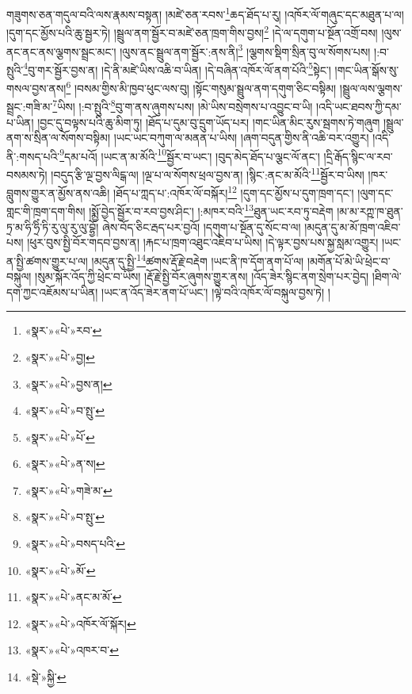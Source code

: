 གཟུགས་ཅན་གདུལ་བའི་ལས་རྣམས་བསྟན། །མཛེ་ཅན་རབས་\footnote{«སྣར་»«པེ་»རབ་}ཆད་ཐོད་པ་རུ། །འཁོར་ལོ་གཞུང་དང་མཐུན་པ་ལ། །དུག་དང་མྱོས་པའི་ཆུ་སྦྱར་ཏེ། །སྦྲུལ་ནག་སྦྱོར་བ་མཛེ་ཅན་ཁྲག་གིས་བྱས།\footnote{«སྣར་»«པེ་»བྱ།} །དེ་ལ་དགུག་པ་སྔོན་འགྲོ་བས། །ལུས་ནང་ནང་ནས་ལྕགས་སྦྲང་མང་། །ལུས་ནང་སྦྲུལ་ནག་སྦྱོར་:ནས་ནི།\footnote{«སྣར་»«པེ་»བྱས་ན།} །ལྕགས་སྡིག་སྲིན་བུ་ལ་སོགས་པས། །:བ་སྤུའི་\footnote{«སྣར་»«པེ་»བ་སྤུ་}བུ་གར་སྦྱོར་བྱས་ན། །དེ་ནི་མཛེ་ཡིས་འཆི་བ་ཡིན། །དེ་བཞིན་འཁོར་ལོ་ནག་པོའི་\footnote{«སྣར་»«པེ་»པོ་}སྟེང་། །གང་ཡིན་སྒོས་སུ་གསལ་བྱས་ནས།\footnote{«སྣར་»«པེ་»ན་ས།} །བསམ་གྱིས་མི་ཁྱབ་ཕུང་ལས་བུ། །སྟོང་གསུམ་སྦྲུལ་ནག་དགུག་ཅིང་བསྟིམ། །སྦྲུལ་ལས་ལྕགས་སྦྲང་:གཟི་མ་\footnote{«སྣར་»«པེ་»གཟེ་མ་}ཡིས། །:བ་སྤུའི་\footnote{«སྣར་»«པེ་»བ་སྤུ་}བུ་ག་ནས་ཞུགས་པས། །མེ་ཡིས་བསྲེགས་པ་འབྱུང་བ་ཡི། །འདི་ཡང་ཐབས་ཀྱི་དམ་པ་ཡིན། །བྱང་དུ་བལྟས་པའི་ཆུ་མིག་ཏུ། །ཐོད་པ་དུམ་བུ་དྲུག་ཡོད་པར། །གང་ཡིན་མིང་རུས་སྦགས་ཏེ་གཞུག །སྦྲུལ་ནག་ས་སྲིན་ལ་སོགས་བསྟིམ། །ཡང་ཡང་བཀུག་ལ་མནན་པ་ཡིས། །ཞག་བདུན་གྱིས་ནི་འཆི་བར་འགྱུར། །འདི་ནི་:གསད་པའི་\footnote{«སྣར་»«པེ་»བསད་པའི་}དམ་པའོ། །ཡང་ན་མ་མོའི་\footnote{«སྣར་»«པེ་»མོ་}སྦྱོར་བ་ཡང་། །བུད་མེད་ཐོད་པ་ལྕང་ལོ་ནང་། །དྲི་རྒོད་སྙིང་ལ་རབ་བསམས་ཏེ། །བདུད་རྩི་ལྔ་བྱས་ལིངྒ་ལ། །ལྔ་པ་ལ་སོགས་ཕྲལ་བྱས་ན། །སྙིང་:ནང་མ་མོའི་\footnote{«སྣར་»«པེ་»ནང་མ་མོ་}སྦྱོར་བ་ཡིས། །ཁར་བླུགས་གྱུར་ན་མྱོས་ནས་འཆི། །ཐོད་པ་ཀླད་པ་:འཁོར་ལོ་བསྐོར།\footnote{«སྣར་»«པེ་»འཁོར་ལོ་སྐོར།} །དུག་དང་མྱོས་པ་དུག་ཁྲག་དང་། །ལུག་དང་གླང་གི་ཁྲག་དག་གིས། །སྨྱོ་བྱེད་སྦྱོར་བ་རབ་བྱས་ཤིང་། །:མཁར་བའི་\footnote{«སྣར་»«པེ་»འཁར་བ་}ཐུན་ཡང་རབ་ཏུ་བརྡེག །མ་མ་རཀྵ་ཁ་ཐུན་ཏྲ་མ་ཧི་ཧྲིཾ་ཏི་རུ་ལུ་རུ་ལུ་བྷྱོ། ཞེས་བོད་ཅིང་རྦད་པར་བྱའོ། །དགུག་པ་སྔོན་དུ་སོང་བ་ལ། །མདུན་དུ་མ་མོ་ཁྲག་འཇིབ་པས། །ཕུར་བུས་སྤྱི་བོར་གདབ་བྱས་ན། །རྐང་པ་ཁྲག་འཐུང་འཇིབ་པ་ཡིས། །དེ་ལྟར་བྱས་པས་སྐྱ་སླམ་འགྱུར། །ཡང་ན་སྤྱི་ཚགས་གྱུར་པ་ལ། །མདུན་དུ་སྤྱི་\footnote{«སྡེ་»སྐྱི་}ཚགས་རྡོ་རྗེ་བརྡེག །ཡང་ནི་ཁ་དོག་ནག་པོ་ལ། །མགོན་པོ་མེ་ཡི་ཕྲེང་བ་བསྐུལ། །སུམ་སྐོར་འོད་ཀྱི་ཕྲེང་བ་ཡིས། །རྡོ་རྗེ་སྤྱི་བོར་ཞུགས་གྱུར་ནས། །འོད་ཟེར་སྙིང་ནག་སྲེག་པར་བྱེད། །ཐིག་ལེ་དག་ཀྱང་འཇོམས་པ་ཡིན། །ཡང་ན་འོད་ཟེར་ནག་པོ་ཡང་། །ལྟེ་བའི་འཁོར་ལོ་བསྐུལ་བྱས་ཏེ། །

